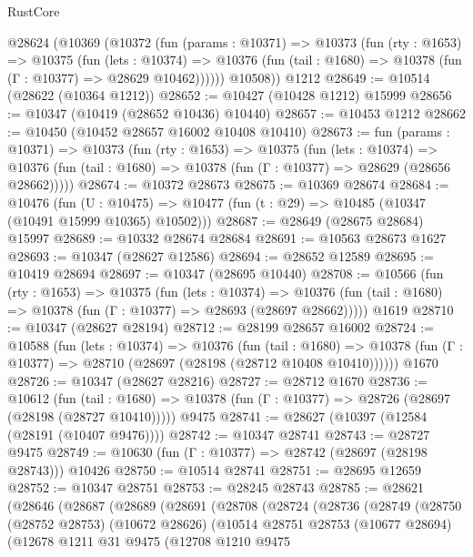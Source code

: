 \begin{lexlean}{RustCore}
\begin{coremodule}
    @28624
      (@10369
        (@10372
          (fun (params : @10371) =>
          @10373
            (fun (rty : @1653) =>
            @10375
              (fun (lets : @10374) =>
              @10376 (fun (tail : @1680) => @10378 (fun (Γ : @10377) => @28629 @10462))))))
        @10508))
    @1212
@28649 := @10514 (@28622 (@10364 @1212))
@28652 := @10427 (@10428 @1212) @15999
@28656 := @10347 (@10419 (@28652 @10436) @10440)
@28657 := @10453 @1212
@28662 := @10450 (@10452 @28657 @16002 @10408 @10410)
@28673 := fun (params : @10371) =>
  @10373
    (fun (rty : @1653) =>
    @10375
      (fun (lets : @10374) =>
      @10376 (fun (tail : @1680) => @10378 (fun (Γ : @10377) => @28629 (@28656 @28662)))))
@28674 := @10372 @28673
@28675 := @10369 @28674
@28684 := @10476
    (fun (U : @10475) => @10477 (fun (t : @29) => @10485 (@10347 (@10491 @15999 @10365) @10502)))
@28687 := @28649 (@28675 @28684) @15997
@28689 := @10332 @28674 @28684
@28691 := @10563 @28673 @1627
@28693 := @10347 (@28627 @12586)
@28694 := @28652 @12589
@28695 := @10419 @28694
@28697 := @10347 (@28695 @10440)
@28708 := @10566
    (fun (rty : @1653) =>
    @10375
      (fun (lets : @10374) =>
      @10376 (fun (tail : @1680) => @10378 (fun (Γ : @10377) => @28693 (@28697 @28662)))))
    @1619
@28710 := @10347 (@28627 @28194)
@28712 := @28199 @28657 @16002
@28724 := @10588
    (fun (lets : @10374) =>
    @10376
      (fun (tail : @1680) =>
      @10378 (fun (Γ : @10377) => @28710 (@28697 (@28198 (@28712 @10408 @10410))))))
    @1670
@28726 := @10347 (@28627 @28216)
@28727 := @28712 @1670
@28736 := @10612
    (fun (tail : @1680) => @10378 (fun (Γ : @10377) => @28726 (@28697 (@28198 (@28727 @10410)))))
    @9475
@28741 := @28627 (@10397 (@12584 (@28191 (@10407 @9476))))
@28742 := @10347 @28741
@28743 := @28727 @9475
@28749 := @10630 (fun (Γ : @10377) => @28742 (@28697 (@28198 @28743))) @10426
@28750 := @10514 @28741
@28751 := @28695 @12659
@28752 := @10347 @28751
@28753 := @28245 @28743
@28785 := @28621
    (@28646
      (@28687
        (@28689
          (@28691
            (@28708
              (@28724
                (@28736
                  (@28749
                    (@28750
                      (@28752 @28753)
                      (@10672 @28626)
                      (@10514
                        @28751
                        @28753
                        (@10677 @28694)
                        (@12678
                          @1211
                          @31
                          @9475
                          (@12708
                            @1210
                            @9475

\end{coremodule}
\end{lexlean}
